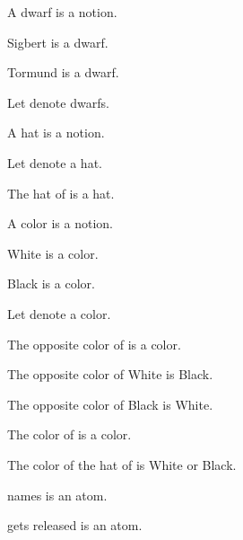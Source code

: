 \documentclass{article}
\begin{document}
\begin{forthel}

\begin{signature}
A dwarf is a notion.
\end{signature}

\begin{signature}
Sigbert is a dwarf.
\end{signature}

\begin{signature}
Tormund is a dwarf.
\end{signature}

Let  denote dwarfs.

\begin{signature}
A hat is a notion.
\end{signature}

Let  denote a hat.

\begin{signature}
The hat of  is a hat.
\end{signature}

\begin{signature}
A color is a notion.
\end{signature}

\begin{signature}
White is a color.
\end{signature}

\begin{signature}
Black is a color.
\end{signature}

Let  denote a color.

\begin{signature}
The opposite color of  is a color.
\end{signature}

\begin{axiom}
The opposite color of White is Black.
\end{axiom}

\begin{axiom}
The opposite color of Black is White.
\end{axiom}

\begin{signature}
The color of  is a color.
\end{signature}

\begin{axiom}
The color of the hat of  is White or Black.
\end{axiom}

\begin{signature}
 names  is an atom.
\end{signature}

\begin{signature}
 gets released is an atom.
\end{signature}

\end{forthel}
\end{document}
